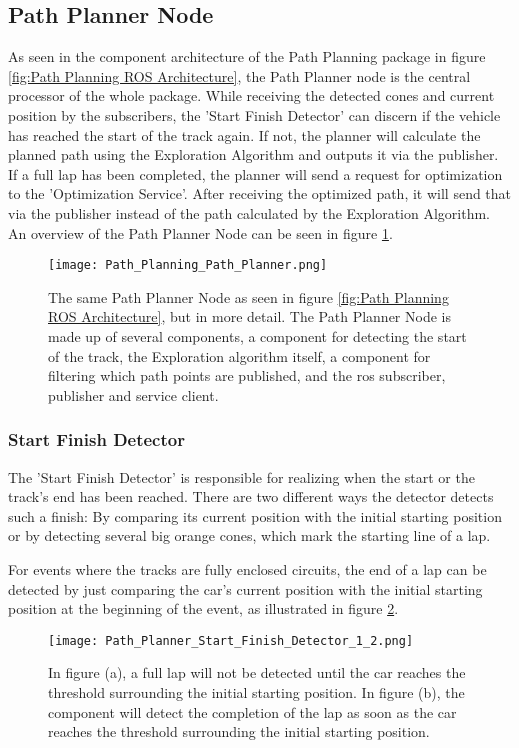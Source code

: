 \subsection{Path Planner Node} \label{sec:Path Planner Node}
As seen in the component architecture of the Path Planning package in figure \ref{fig:Path Planning ROS Architecture}, the Path Planner node is the central processor of the whole package.
While receiving the detected cones and current position by the subscribers, the 'Start Finish Detector' can discern if the vehicle has reached the start of the track again. If not, the planner will calculate the planned path using the Exploration Algorithm and outputs it via the publisher. If a full lap has been completed, the planner will send a request for optimization to the 'Optimization Service'. After receiving the optimized path, it will send that via the publisher instead of the path calculated by the Exploration Algorithm. An overview of the Path Planner Node can be seen in figure \ref{fig:Path Planning Path Planner Node}.
\begin{figure}[H]
    \centering
    \texttt{[image: Path\_Planning\_Path\_Planner.png]}
    \caption{The same Path Planner Node as seen in figure \ref{fig:Path Planning ROS Architecture}, but in more detail. The Path Planner Node is made up of several components, a component for detecting the start of the track, the Exploration algorithm itself, a component for filtering which path points are published, and the \acrshort{ros} subscriber, publisher and service client.}
    \label{fig:Path Planning Path Planner Node}
\end{figure}

\subsubsection{Start Finish Detector} \label{sec:Start Finish Detector} 
The 'Start Finish Detector' is responsible for realizing when the start or the track's end has been reached. There are two different ways the detector detects such a finish: By comparing its current position with the initial starting position or by detecting several big orange cones, which mark the starting line of a lap.

For events where the tracks are fully enclosed circuits, the end of a lap can be detected by just comparing the car's current position with the initial starting position at the beginning of the event, as illustrated in figure \ref{fig:Path Planner Start Finish Detector 1 and 2}.
\begin{figure}[H]
    \centering
    \texttt{[image: Path\_Planner\_Start\_Finish\_Detector\_1\_2.png]}
    \caption{In figure (a), a full lap will not be detected until the car reaches the threshold surrounding the initial starting position. In figure (b), the component will detect the completion of the lap as soon as the car reaches the threshold surrounding the initial starting position.}
    \label{fig:Path Planner Start Finish Detector 1 and 2}
\end{figure}

